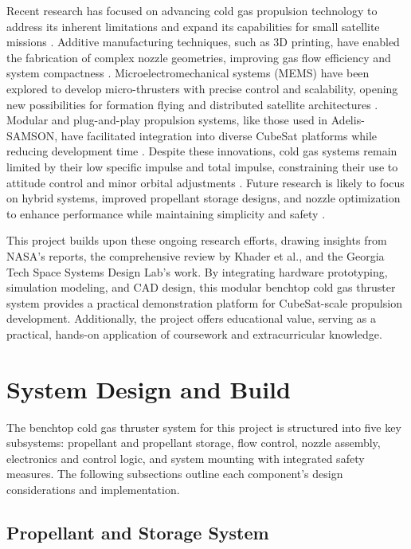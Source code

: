 \documentclass{new-aiaa}
\begin{document}
Recent research has focused on advancing cold gas propulsion technology to address its inherent limitations and expand its capabilities for small satellite missions \cite{nasa2021,khader2018space,skidmore2016,adelis2019}. Additive manufacturing techniques, such as 3D printing, have enabled the fabrication of complex nozzle geometries, improving gas flow efficiency and system compactness \cite{skidmore2016}. Microelectromechanical systems (MEMS) have been explored to develop micro-thrusters with precise control and scalability, opening new possibilities for formation flying and distributed satellite architectures \cite{khader2018space}. Modular and plug-and-play propulsion systems, like those used in Adelis-SAMSON, have facilitated integration into diverse CubeSat platforms while reducing development time \cite{adelis2019}. Despite these innovations, cold gas systems remain limited by their low specific impulse and total impulse, constraining their use to attitude control and minor orbital adjustments \cite{nasa2021,khader2018space}. Future research is likely to focus on hybrid systems, improved propellant storage designs, and nozzle optimization to enhance performance while maintaining simplicity and safety \cite{nasa2021,khader2018space}.

This project builds upon these ongoing research efforts, drawing insights from NASA’s reports, the comprehensive review by Khader et al., and the Georgia Tech Space Systems Design Lab’s work. By integrating hardware prototyping, simulation modeling, and CAD design, this modular benchtop cold gas thruster system provides a practical demonstration platform for CubeSat-scale propulsion development. Additionally, the project offers educational value, serving as a practical, hands-on application of coursework and extracurricular knowledge.


\section{System Design and Build}

The benchtop cold gas thruster system for this project is structured into five key subsystems: propellant and propellant storage, flow control, nozzle assembly, electronics and control logic, and system mounting with integrated safety measures. The following subsections outline each component's design considerations and implementation.

\subsection{Propellant and Storage System}
\end{document}
